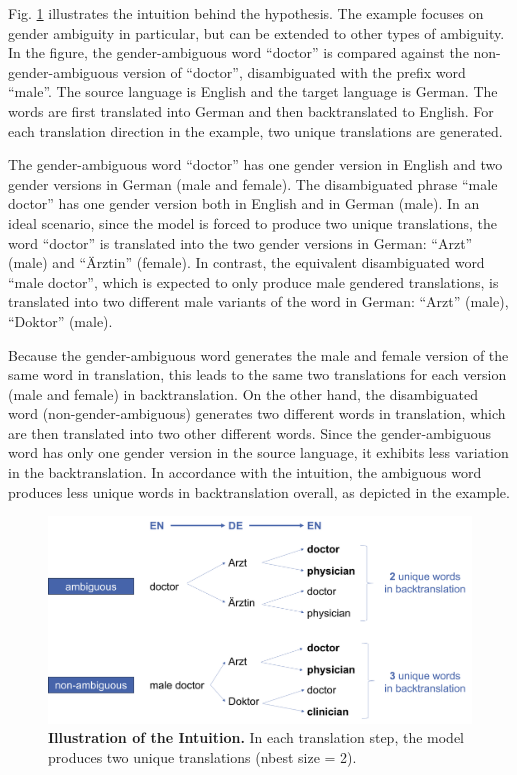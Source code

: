 Fig. \ref{fig:intuition} illustrates the intuition behind the hypothesis. The example focuses on gender ambiguity in particular, but can be extended to other types of ambiguity. In the figure, the gender-ambiguous word “doctor” is compared against the non-gender-ambiguous version of “doctor”, disambiguated with the prefix word “male”. The source language is English and the target language is German. The words are first translated into German and then backtranslated to English. For each translation direction in the example, two unique translations are generated. 

The gender-ambiguous word “doctor” has one gender version in English and two gender versions in German (male and female). The disambiguated phrase “male doctor” has one gender version both in English and in German (male). In an ideal scenario, since the model is forced to produce two unique translations, the word “doctor” is translated into the two gender versions in German: “Arzt” (male) and “Ärztin” (female). In contrast, the equivalent disambiguated word “male doctor”, which is expected to only produce male gendered translations, is translated into two different male variants of the word in German: “Arzt” (male), “Doktor” (male). 

Because the gender-ambiguous word generates the male and female version of the same word in translation, this leads to the same two translations for each version (male and female) in backtranslation. On the other hand, the disambiguated word (non-gender-ambiguous) generates two different words in translation, which are then translated into two other different words. Since the gender-ambiguous word has only one gender version in the source language, it exhibits less variation in the backtranslation. In accordance with the intuition, the ambiguous word produces less unique words in backtranslation overall, as depicted in the example.


\begin{figure}[!htb]
  \centering
  \includegraphics[scale=0.45]{figures/intuition.png}
  \caption[Illustration of the Intuition]{\textbf{Illustration of the Intuition.} In each translation step, the model produces two unique translations (nbest size = 2).}
  \label{fig:intuition}
\end{figure}


